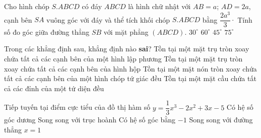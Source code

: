 \begin{ex}%
Cho hình chóp $S.ABCD$ có đáy $ABCD$ là hình chữ nhật với $AB=a$; $AD=2a$, cạnh bên $SA$ vuông góc với đáy và thể tích khối chóp $S.ABCD$ bằng $\dfrac{2a^3}{3}\cdot$ Tính số đo góc giữa đường thẳng $SB$ với mặt phẳng $(ABCD)$.
\choice
{$30^\circ$}
{$60^\circ$}
{\True $45^\circ$}
{$75^\circ$}
\end{ex}

\begin{ex}%
Trong các khẳng định sau, khẳng định nào \textbf{sai}?
\choice
{Tồn tại một mặt trụ tròn xoay chứa tất cả các cạnh bên của một hình lập phương}
{\True Tồn tại một mặt trụ tròn xoay chứa tất cả các cạnh bên của hình hộp}
{Tồn tại một mặt nón tròn xoay chứa tất cả các cạnh bên của một hình chóp tứ giác đều}
{Tồn tại một mặt cầu chứa tất cả các đỉnh của một tứ diện đều}
\end{ex}

\begin{ex}%
Tiếp tuyến tại điểm cực tiểu của đồ thị hàm số $y=\dfrac{1}{3}x^3-2x^2+3x-5$
\choice
{Có hệ số góc dương}
{\True Song song với trục hoành}
{Có hệ số góc bằng $-1$}
{Song song với đường thẳng $x=1$}
\end{ex}

